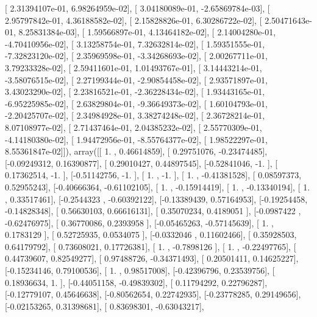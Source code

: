 \documentclass{article}
\begin{document}
       [  2.31394107e-01,   6.98264959e-02],
       [  3.04180089e-01,  -2.65869784e-03],
       [  2.95797842e-01,   4.36188582e-02],
       [  2.15828826e-01,   6.30286722e-02],
       [  2.50471643e-01,   8.25831384e-03],
       [  1.59566897e-01,   4.13464182e-02],
       [  2.14004280e-01,  -4.70410956e-02],
       [  3.13258754e-01,   7.32632814e-02],
       [  1.59351555e-01,  -7.32823120e-02],
       [  2.35969598e-01,  -3.34268693e-02],
       [  2.00267711e-01,   3.79233328e-02],
       [  2.59411601e-01,   1.01493767e-01],
       [  3.14443214e-01,  -3.58076515e-02],
       [  2.27199344e-01,  -2.90854458e-02],
       [  2.93571897e-01,   3.43023290e-02],
       [  2.23816521e-01,  -2.36228434e-02],
       [  1.93443165e-01,  -6.95225985e-02],
       [  2.63829804e-01,  -9.36649373e-02],
       [  1.60104793e-01,  -2.20425707e-02],
       [  2.34984928e-01,   3.38274248e-02],
       [  2.36728214e-01,   8.07108977e-02],
       [  2.71437464e-01,   2.04385232e-02],
       [  2.55770309e-01,  -4.14180380e-02],
       [  1.94472956e-01,  -8.55764377e-02],
       [  1.98522297e-01,   8.55361847e-02]]), array([[ 1.        ,  0.46614859],
       [ 0.29751076, -0.23474485],
       [-0.09249312,  0.16390877],
       [ 0.29010427,  0.44897545],
       [-0.52841046, -1.        ],
       [ 0.17362514, -1.        ],
       [-0.51142756, -1.        ],
       [ 1.        , -1.        ],
       [ 1.        , -0.41381528],
       [ 0.08597373,  0.52955243],
       [-0.40666364, -0.61102105],
       [ 1.        , -0.15914419],
       [ 1.        , -0.13340194],
       [ 1.        ,  0.33517461],
       [-0.2544323 , -0.60392122],
       [-0.13389439,  0.57164953],
       [-0.19254458, -0.14828348],
       [ 0.56630103,  0.66616131],
       [ 0.35070234,  0.4189051 ],
       [-0.0987422 , -0.62476975],
       [ 0.36770086,  0.2393958 ],
       [-0.05465263, -0.57145639],
       [ 1.        ,  0.1783129 ],
       [ 0.52725935,  0.0534075 ],
       [-0.0332046 ,  0.11602466],
       [ 0.35928503,  0.64179792],
       [ 0.73608021,  0.17726381],
       [ 1.        , -0.7898126 ],
       [ 1.        , -0.22497765],
       [ 0.44739607,  0.82549277],
       [ 0.97488726, -0.34371493],
       [ 0.20501411,  0.14625227],
       [-0.15234146,  0.79100536],
       [ 1.        ,  0.98517008],
       [-0.42396796,  0.23539756],
       [ 0.18936634,  1.        ],
       [-0.44051158, -0.49839302],
       [ 0.11794292,  0.22796287],
       [-0.12779107,  0.45646638],
       [-0.80562654,  0.22742935],
       [-0.23778285,  0.29149656],
       [-0.02153265,  0.31398681],
       [ 0.83698301, -0.63043217],
\end{document}
